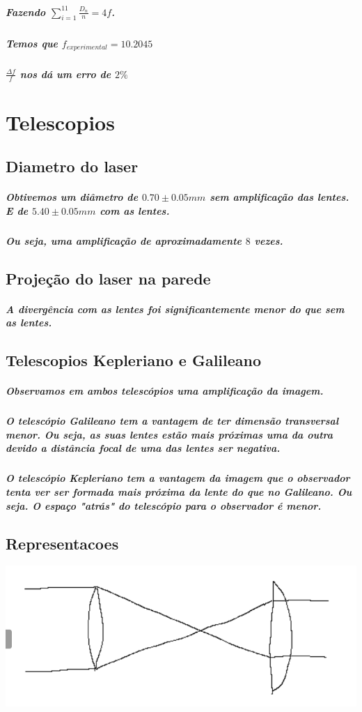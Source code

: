 \documentclass[12pt,twoside, a4paper, twocolumn]{article}
\begin{document}
\subparagraph*{Fazendo $\sum_{i=1}^{11} \frac{D_n}{n} = 4f$.}

\subparagraph*{Temos que $f_{experimental} = 10.2045$}

\subparagraph*{$\frac{\varDelta f}{f}$ nos dá um erro de  $2\%$}

\section{Telescopios}

\subsection{Diametro do laser}

\subparagraph*{Obtivemos um diâmetro de $0.70 \pm 0.05mm$ sem amplificação das lentes. E de $5.40 \pm 0.05mm$ com as lentes.}

\subparagraph*{Ou seja, uma amplificação de aproximadamente $8$ vezes.}

\subsection*{Projeção do laser na parede}

\subparagraph*{A divergência com as lentes foi significantemente menor do que sem as lentes.}

\subsection{Telescopios Kepleriano e Galileano}

\subparagraph*{Observamos em ambos telescópios uma amplificação da imagem.}

\subparagraph*{O telescópio Galileano tem a vantagem de ter dimensão transversal menor. Ou seja, as suas lentes estão mais próximas uma da outra devido a distância focal de uma das lentes ser negativa.}

\subparagraph*{O telescópio Kepleriano tem a vantagem da imagem que o observador tenta ver ser formada mais próxima da lente do que no Galileano. Ou seja. O espaço "atrás" do telescópio para o observador é menor.}

\subsection{Representacoes}

\begin{adjustbox}{scale=0.70}
  \includegraphics{Graph2.png}
\end{adjustbox}
\end{document}
